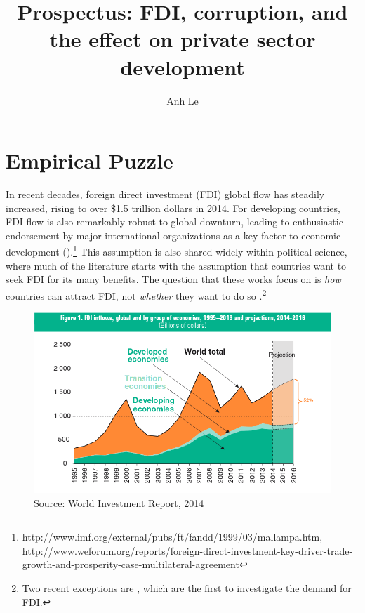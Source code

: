 \documentclass[12pt]{article}
\title{Prospectus: FDI, corruption, and the effect on private sector development}
\author{Anh Le}
\begin{document}
\maketitle

\section{Empirical Puzzle}

In recent decades, foreign direct investment (FDI) global flow has steadily increased, rising to over \$1.5 trillion dollars in 2014. For developing countries, FDI flow is also remarkably robust to global downturn, leading to enthusiastic endorsement by major international organizations as a key factor to economic development ().\footnote{http://www.imf.org/external/pubs/ft/fandd/1999/03/mallampa.htm, http://www.weforum.org/reports/foreign-direct-investment-key-driver-trade-growth-and-prosperity-case-multilateral-agreement} This assumption is also shared widely within political science, where much of the literature starts with the assumption that countries want to seek FDI for its many benefits. The question that these works focus on is \textit{how} countries can attract FDI, not \textit{whether} they want to do so \citep{Jensen2003, Li2003, Li2006, Ahlquist2006}.\footnote{Two recent exceptions are \citet{Pinto2013, Pandya2013}, which are the first to investigate the demand for FDI.} 

\begin{figure}[!ht]
\includegraphics[width=\textwidth, height=\textheight,keepaspectratio]{../figure/global_fdi}
\caption{Source: World Investment Report, 2014}
\label{fig:globalfdi}
\end{figure}
\end{document}
